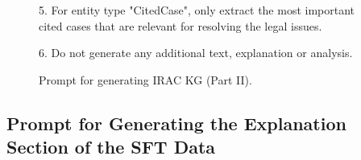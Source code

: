 \begin{figure}[htbp]
\begin{tcolorbox}[enhanced,colback=orange!5!white,colframe=orange!75!black,title=Prompt for Generating IRAC KG (Part II)]
5. For entity type "CitedCase", only extract the most important cited cases that are relevant for resolving the legal issues.\newline

6. Do not generate any additional text, explanation or analysis.\newline

\end{tcolorbox}
\caption{Prompt for generating IRAC KG (Part II).}
\label{figure:prompt_kg_part2}
\end{figure}

\subsection{Prompt for Generating the Explanation Section of the SFT Data}
\label{section:appendix_prompt_sft}

